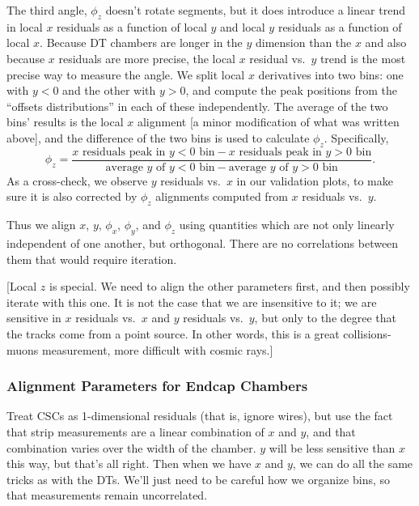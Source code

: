\documentclass[12pt]{article}
\begin{document}
The third angle, $\phi_z$ doesn't rotate segments, but it does
introduce a linear trend in local $x$ residuals as a function of local
$y$ and local $y$ residuals as a function of local $x$.  Because DT
chambers are longer in the $y$ dimension than the $x$ and also because
$x$ residuals are more precise, the local $x$ residual vs.\ $y$ trend
is the most precise way to measure the angle.  We split local $x$
derivatives into two bins: one with $y<0$ and the other with $y>0$,
and compute the peak positions from the ``offsets distributions'' in
each of these independently.  The average of the two bins' results is
the local $x$ alignment [a minor modification of what was written
  above], and the difference of the two bins is used to calculate
$\phi_z$.  Specifically,
\begin{equation}
\phi_z = \frac{\mbox{$x$ residuals peak in $y<0$ bin} - \mbox{$x$ residuals peak in $y>0$ bin}}{\mbox{average $y$ of $y<0$ bin} - \mbox{average $y$ of $y>0$ bin}} \mbox{.}
\end{equation}
As a cross-check, we observe $y$ residuals vs.\ $x$ in our validation
plots, to make sure it is also corrected by $\phi_z$ alignments
computed from $x$ residuals vs.\ $y$.

Thus we align $x$, $y$, $\phi_x$, $\phi_y$, and $\phi_z$ using
quantities which are not only linearly independent of one another, but
orthogonal.  There are no correlations between them that would require
iteration.

[Local $z$ is special.  We need to align the other parameters first,
  and then possibly iterate with this one.  It is not the case that we
  are insensitive to it; we are sensitive in $x$ residuals vs.\ $x$
  and $y$ residuals vs.\ $y$, but only to the degree that the tracks
  come from a point source.  In other words, this is a great
  collisions-muons measurement, more difficult with cosmic rays.]

\subsubsection{Alignment Parameters for Endcap Chambers}

Treat CSCs as 1-dimensional residuals (that is, ignore wires), but use
the fact that strip measurements are a linear combination of $x$ and
$y$, and that combination varies over the width of the chamber.  $y$
will be less sensitive than $x$ this way, but that's all right.  Then
when we have $x$ and $y$, we can do all the same tricks as with the
DTs.  We'll just need to be careful how we organize bins, so that
measurements remain uncorrelated.
\end{document}
